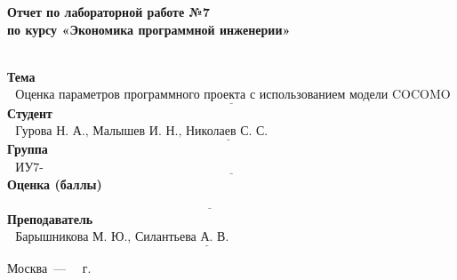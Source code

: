 \begin{titlepage}
	
	\begin{center}
		\Large\textbf{Отчет по лабораторной работе №7}\\
		\Large\textbf{по курсу «Экономика программной инженерии»}\\
		~\\
	\end{center}
	
	\noindent\textbf{Тема} $\underline{\text{~
 Оценка параметров программного проекта с использованием модели COCOMO II}}$\newline\newline
	\noindent\textbf{Студент} $\underline{\text{~~Гурова Н. А., Малышев И. Н., Николаев С. С.~~~~~~~~~~~~~~~~~~~~~~~~~~~~~~~~~~~~~~~~~~~~}}$\newline\newline
	\noindent\textbf{Группа} $\underline{\text{~~ИУ7-84Б~~~~~~~~~~~~~~~~~~~~~~~~~~~~~~~~~~~~~~~~~~~~~~~~~~~~~~~~~~~~~~~~~~~~~~~~~~~~~~~~~~~~~~~~~~~~~~~~~}}$\newline\newline
	\noindent\textbf{Оценка (баллы)} $\underline{\text{ ~~~~~~~~~~~~~~~~~~~~~~~~~~~~~~~~~~~~~~~~~~~~~~~~~~~~~~~~~~~~~~~~~~~~~~~~~~~~~~~~~~~~~~~~~~~~~~~~~}}$\newline\newline
	\noindent\textbf{Преподаватель} $\underline{\text{~~Барышникова М. Ю., Силантьева А. В.~~~~~~~~~~~~~~~~~~~~~~~~~~~~~~~~~~~~~~~~~~~}}$\newline
	
	\begin{center}
		\vfill
		Москва~---~\the\year
		~г.
	\end{center}
	\restoregeometry
\end{titlepage}

